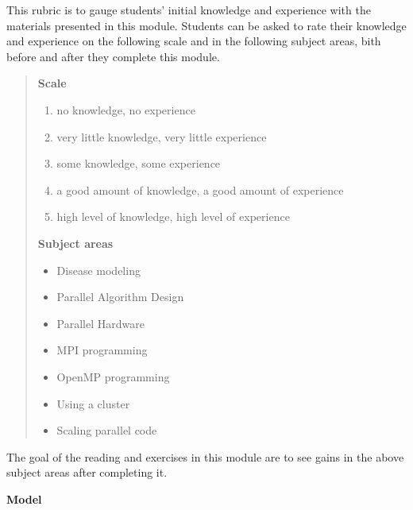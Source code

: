\documentclass[letterpaper,10pt,openany,oneside]{sphinxmanual}
\begin{document}
This rubric is to gauge students’ initial knowledge and experience with
the materials presented in this module. Students can be asked to rate their
knowledge and experience on the following scale and in the following
subject areas, bith before and after they complete this module.
\begin{quote}

\textbf{Scale}
\begin{enumerate}
\item {} 
no knowledge, no experience

\item {} 
very little knowledge, very little experience

\item {} 
some knowledge, some experience

\item {} 
a good amount of knowledge, a good amount of experience

\item {} 
high level of knowledge, high level of experience

\end{enumerate}

\textbf{Subject areas}
\begin{itemize}
\item {} 
Disease modeling

\item {} 
Parallel Algorithm Design

\item {} 
Parallel Hardware

\item {} 
MPI programming

\item {} 
OpenMP programming

\item {} 
Using a cluster

\item {} 
Scaling parallel code

\end{itemize}
\end{quote}

The goal of the reading and exercises in this module are to see gains in the above subject areas
after completing it.

\textbf{Model}
\end{document}
